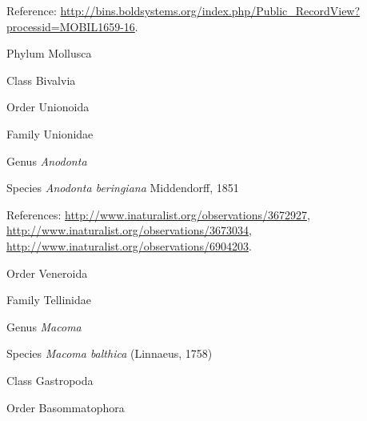\documentclass[9pt, article]{memoir}
\begin{document}
\begin{multicols}{2}
\vspace{6pt}Reference: 
\url{http://bins.boldsystems.org/index.php/Public_RecordView?processid=MOBIL1659-16}.

\vspace{6pt}\noindent\hspace{6pt}Phylum Mollusca


\vspace{6pt}\noindent\hspace{12pt}Class Bivalvia


\vspace{6pt}\noindent\hspace{18pt}Order Unionoida


\vspace{6pt}\noindent\hspace{24pt}Family Unionidae


\vspace{6pt}\noindent\hspace{30pt}Genus \textit{Anodonta}


\vspace{6pt}\noindent\hspace{36pt}Species \textit{Anodonta beringiana} Middendorff, 1851


\vspace{6pt}References: 
\url{http://www.inaturalist.org/observations/3672927}, 
\url{http://www.inaturalist.org/observations/3673034}, 
\url{http://www.inaturalist.org/observations/6904203}.

\vspace{6pt}\noindent\hspace{18pt}Order Veneroida


\vspace{6pt}\noindent\hspace{24pt}Family Tellinidae


\vspace{6pt}\noindent\hspace{30pt}Genus \textit{Macoma}


\vspace{6pt}\noindent\hspace{36pt}Species \textit{Macoma balthica} (Linnaeus, 1758)


\vspace{6pt}\noindent\hspace{12pt}Class Gastropoda


\vspace{6pt}\noindent\hspace{18pt}Order Basommatophora



\end{multicols}
\end{document}
